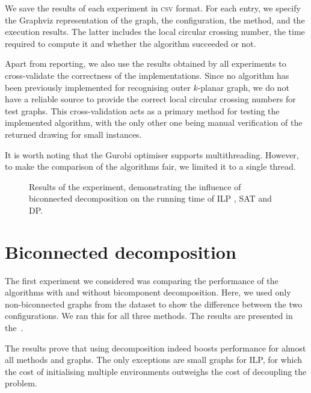 We save the results of each experiment in \textsc{csv} format. For each entry, we specify the Graphviz representation of the graph, the configuration, the method, and the execution results. The latter includes the local circular crossing number, the time required to compute it and whether the algorithm succeeded or not.

Apart from reporting, we also use the results obtained by all experiments to cross-validate the correctness of the implementations. Since no algorithm has been previously implemented for recognising outer \(k\)-planar graph, we do not have a reliable source to provide the correct local circular crossing numbers for test graphs. This cross-validation acts as a primary method for testing the implemented algorithm, with the only other one being manual verification of the returned drawing for small instances.

It is worth noting that the Gurobi optimiser supports multithreading. However, to make the comparison of the algorithms fair, we limited it to a single thread.

\begin{figure}[tbh]
    \centering
     \hfill
     \hfill
    \caption{Results of the experiment, demonstrating the influence of biconnected decomposition on the running time of \textsf{ILP} , \textsf{SAT} and \textsf{DP}.}
    \label{fig:bctree-results}
\end{figure}

\section{Biconnected decomposition}

The first experiment we considered was comparing the performance of the algorithms with and without bicomponent decomposition. Here, we used only non-biconnected graphs from the dataset to show the difference between the two configurations. We ran this for all three methods. The results are presented in the~.

The results prove that using decomposition indeed boosts performance for almost all methods and graphs. The only exceptions are small graphs for \textsf{ILP}, for which the cost of initialising multiple environments outweighs the cost of decoupling the problem.

